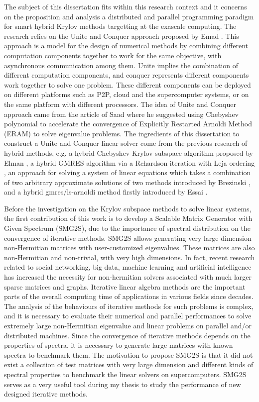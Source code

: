 The subject of this dissertation fits within this research context and it concerns on the proposition and analysis a distributed and parallel programming paradigm for smart hybrid Krylov methods targetting at the exascale computing. The research relies on the Unite and Conquer approach proposed by Emad \cite{emad2016unite}. This approach is a model for the design of numerical methods by combining different computation components together to work for the same objective, with asynchronous communication among them. Unite implies the combination of different computation components, and conquer represents different components work together to solve one problem. These different components can be deployed on different platforms such as P2P, cloud and the supercomputer systems, or on the same platform with different processors. The idea of Unite and Conquer approach came from the article of Saad \cite{saad1984chebyshev} where he suggested using Chebyshev polynomial to accelerate the convergence of Explicitly Restarted Arnoldi Method (ERAM) to solve eigenvalue problems. The ingredients of this dissertation to construct a Unite and Conquer linear solver come from the previous research of hybrid methods, e.g. a hybrid Chebyshev Krylov subspace algorithm proposed by Elman \cite{elman1986hybrid}, a hybrid GMRES algorithm via a Rchardson iteration with Leja ordering \cite{nachtigal1992hybrid}, an approach for solving a system of linear equations which takes a combination of two arbitrary approximate solutions of two methods introduced by Brezinski \cite{brezinski1994hybrid}, and a hybrid gmres/ls-arnoldi method firstly introduced by Essai \cite{essai1999heterogeneous}.

Before the investigation on the Krylov subspace methods to solve linear systems, the first contribution of this work is to develop a Scalable Matrix Generator with Given Spectrum (SMG2S), due to the importance of spectral distribution on the convergence of iterative methods. SMG2S allows generating very large dimension non-Hermitian matrices with user-customized eigenvalues. These matrices are also non-Hermitian and non-trivial, with very high dimensions. In fact, recent research related to social networking, big data, machine learning and artificial intelligence has increased the necessity for non-hermitian solvers associated with much larger sparse matrices and graphs. Iterative linear algebra methods are the important parts of the overall computing time of applications in various fields since decades. The analysis of the behaviours of iterative methods for such problems is complex, and it is necessary to evaluate their numerical and parallel performances to solve extremely large non-Hermitian eigenvalue and linear problems on parallel and/or distributed machines. Since the convergence of iterative methods depends on the properties of spectra, it is necessary to generate large matrices with known spectra to benchmark them. The motivation to propose SMG2S is that it did not exist a collection of test matrices with very large dimension and different kinds of spectral properties to benchmark the linear solvers on supercomputers. SMG2S serves as a very useful tool during my thesis to study the performance of new designed iterative methods.

